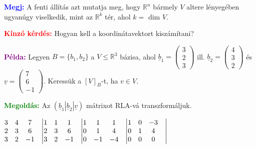 \documentclass[../szamtud.tex]{subfiles}
\begin{document}
        \textcolor{blue}{\textbf{Megj:}} A fenti állítás azt mutatja meg, hogy $\mathbb{R}^n$ bármely $V$ altere lényegében ugyanúgy viselkedik, mint az $\mathbb{R}^k$ tér, ahol $k =$ dim $V$.

        \textcolor{red}{\textbf{Kínzó kérdés:}} Hogyan kell a koordinátavektort kiszámítani?

        \textcolor{purple}{\textbf{Példa:}} Legyen $B = \{b_1, b_2\}$ a $V \leq \mathbb{R}^3$ bázisa, ahol $\underline{b}_1 = \begin{pmatrix} 3 \\ 2 \\ 3 \end{pmatrix}$ ill. $\underline{b}_2 = \begin{pmatrix} 4 \\ 3 \\ 2 \end{pmatrix}$ és $\underline{v} = \begin{pmatrix} 7 \\ 6 \\ -1 \end{pmatrix}$. Keressük a $[V]_B$-t, ha $v \in V$.

        \textcolor{green}{\textbf{Megoldás:}} Az $(\underline{b}_1|\underline{b}_2|\underline{v})$ mátrixot RLA-vá transzformáljuk.

        $\begin{matrix}
            3 & 4 & 7 & \bigm| \\
            2 & 3 & 6 & \bigm| \\
            3 & 2 & -1 & \bigm| 
        \end{matrix}
        \begin{matrix}
            1 & 1 & 1 & \bigm| \\
            2 & 3 & 6 & \bigm| \\
            3 & 2 & -1 & \bigm| 
        \end{matrix}
        \begin{matrix}
            1 & 1 & 1 & \bigm| \\
            0 & 1 & 4 & \bigm| \\
            0 & -1 & -4 & \bigm| 
        \end{matrix}
        \begin{matrix}
            1 & 0 & -3 & \bigm| \\
            0 & 1 & 4 & \bigm| \\
            0 & 0 & 0 & \bigm| 
        \end{matrix}$
\end{document}
